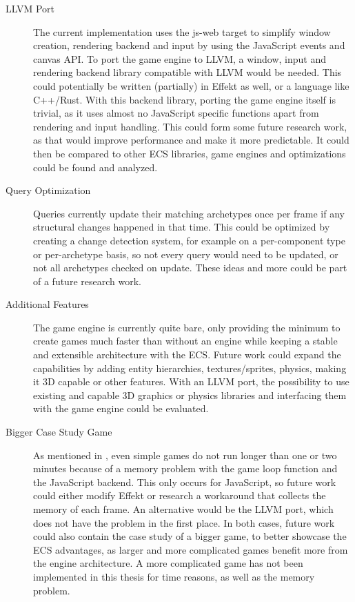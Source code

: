 \begin{description}
\item[LLVM Port] The current implementation uses the \textsf{js-web} target to simplify window creation, rendering backend and input by using the JavaScript events and canvas API. To port the game engine to LLVM, a window, input and rendering backend library compatible with LLVM would be needed. This could potentially be written (partially) in Effekt as well, or a language like C++/Rust. With this backend library, porting the game engine itself is trivial, as it uses almost no JavaScript specific functions apart from rendering and input handling. This could form some future research work, as that would improve performance and make it more predictable. It could then be compared to other ECS libraries, game engines and optimizations could be found and analyzed.
\item[Query Optimization] Queries currently update their matching archetypes once per frame if any structural changes happened in that time. This could be optimized by creating a change detection system, for example on a per-component type or per-archetype basis, so not every query would need to be updated, or not all archetypes checked on update. These ideas and more could be part of a future research work.
\item[Additional Features] The game engine is currently quite bare, only providing the minimum to create games much faster than without an engine while keeping a stable and extensible architecture with the ECS. Future work could expand the capabilities by adding entity hierarchies, textures/sprites, physics, making it 3D capable or other features. With an LLVM port, the possibility to use existing and capable 3D graphics or physics libraries and interfacing them with the game engine could be evaluated.
\item[Bigger Case Study Game] As mentioned in , even simple games do not run longer than one or two minutes because of a memory problem with the game loop function and the JavaScript backend. This only occurs for JavaScript, so future work could either modify Effekt or research a workaround that collects the memory of each frame. An alternative would be the LLVM port, which does not have the problem in the first place. In both cases, future work could also contain the case study of a bigger game, to better showcase the ECS advantages, as larger and more complicated games benefit more from the engine architecture. A more complicated game has not been implemented in this thesis for time reasons, as well as the memory problem.
\end{description}
